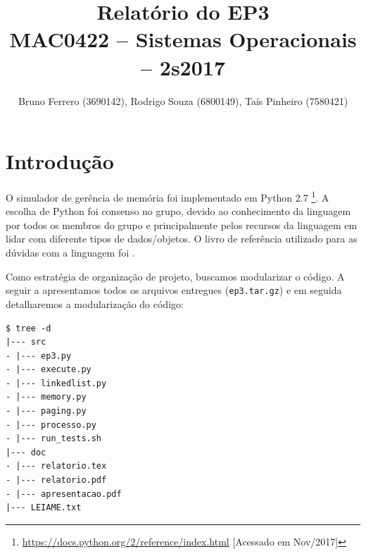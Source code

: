 \documentclass[12pt,a4paper]{article}
\title{Relatório do EP3\\MAC0422 -- Sistemas Operacionais -- 2s2017}
\author{Bruno Ferrero (3690142), Rodrigo Souza (6800149), Taís Pinheiro (7580421)}
\date{}
\begin{document}
\maketitle

\section{Introdução}
O simulador de gerência de memória foi implementado em Python 2.7 \footnote{\url{https://docs.python.org/2/reference/index.html} [Acessado em Nov/2017]}. A escolha de Python foi consenso no grupo, devido ao conhecimento da linguagem por todos os membros do grupo e principalmente pelos recursos da linguagem em lidar com diferente tipos de dados/objetos. O livro de referência utilizado para as dúvidas com a linguagem foi \cite{pythoncookbook}. 

Como estratégia de organização de projeto, buscamos modularizar o código. A seguir a apresentamos todos os arquivos entregues (\texttt{ep3.tar.gz}) e em seguida detalharemos a modularização do código: 

\begin{lstlisting}
$ tree -d
|--- src
- |--- ep3.py
- |--- execute.py
- |--- linkedlist.py
- |--- memory.py
- |--- paging.py
- |--- processo.py
- |--- run_tests.sh
|--- doc
- |--- relatorio.tex
- |--- relatorio.pdf
- |--- apresentacao.pdf
|--- LEIAME.txt
\end{lstlisting}
\end{document}
